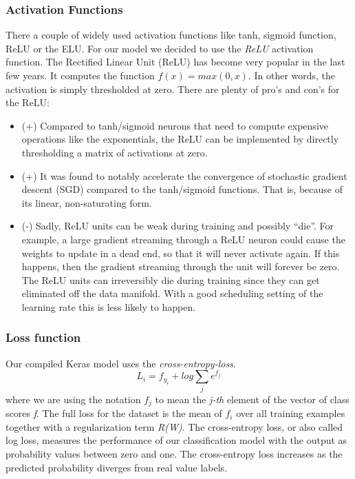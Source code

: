 \documentclass[journal]{IEEEtran}
\begin{document}
\subsubsection{Activation Functions}
\label{sec:activationFunctions}
\noindent There a couple of widely used activation functions like tanh, sigmoid function, ReLU or the ELU. For our model we decided to use the \textit{ReLU} activation function. The Rectified Linear Unit (ReLU) has become very popular in the last few years. It computes the function \(f(x)=max(0,x)\). In other words, the activation is simply thresholded at zero. There are plenty of pro's and con's for the ReLU:
\begin{itemize}
\item (+) Compared to tanh/sigmoid neurons that need to compute expensive operations  like the exponentials, the ReLU can be implemented by directly thresholding a matrix of activations at zero.
\item (+) It was found to notably accelerate the convergence of stochastic gradient descent (SGD) compared to the tanh/sigmoid functions. That is, because of its linear, non-saturating form.
\item (-) Sadly, ReLU units can be weak during training and possibly “die”. For example, a large gradient streaming through a ReLU neuron could cause the weights to update in a dead end, so that it will never activate again. If this happens, then the gradient streaming through the unit will forever be zero. The ReLU units can irreversibly die during training since they can get eliminated off the data manifold. With a good scheduling setting of the learning rate this is less likely to happen. \\
\end{itemize}
\subsubsection{Loss function}
\noindent Our compiled Keras model uses the \textit{cross-entropy-loss}. 
\begin{equation}
L_{i} = f_{y_{i}} + log \sum_{j} e^{f_{j}}
\end{equation}
where we are using the notation \(f_{j}\) to mean the \textit{j-th} element of the vector of class scores \textit{f}. The full loss for the dataset is the mean of \(f_{i}\) over all training examples together with a regularization term \textit{R(W)}.
The cross-entropy loss, or also called log loss, measures the performance of our classification model with the output as probability values between zero and one. The cross-entropy loss increases as the predicted probability diverges from real value labels.
\end{document}
